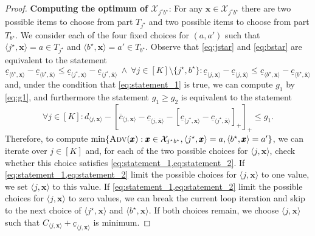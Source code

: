 \documentclass[a4paper,11pt,abstracton]{scrartcl}
\theoremstyle{definition}
\theoremstyle{remark}
\newcommand{\X}{\mathcal{X}}
\begin{document}
\begin{proof}
\textbf{Computing the optimum of $\X_{j^\star b^\star}$}: 
For any $\pmb x \in \X_{j^\star b^\star}$ 
there are two possible items to choose from part $T_{j^\star}$ and two possible items to choose from part $T_{b^\star}$.
We consider each of the four fixed choices for $(a,a')$ such that $\langle j^\star,\pmb{x}\rangle = a \in T_{j^\star}$ and $\langle b^\star,\pmb{x}\rangle = a' \in T_{b^\star}$.
Observe that \cref{eq:jstar} and \cref{eq:bstar} are equivalent to the statement 
\begin{equation} \underline{c}_{\langle b^\star,\pmb{x}\rangle} - \underline{c}_{\langle b^\star,\overline{\pmb{x}}\rangle} \leq \underline{c}_{\langle j^\star,\pmb{x}\rangle} - \underline{c}_{\langle j^\star,\overline{\pmb{x}}\rangle} \ \land \ \forall j \in [K] \setminus \{j^\star, b^\star\} : \underline{c}_{\langle j,\pmb{x}\rangle} - \underline{c}_{\langle j, \overline{\pmb{x}}\rangle} \leq \underline{c}_{\langle b^\star,\pmb{x}\rangle} - \underline{c}_{\langle b^\star,\overline{\pmb{x}}\rangle} 
\label{eq:statement_1}
\end{equation}
and, under the condition that \cref{eq:statement_1} is true, we can compute $g_1$ by \cref{eq:g1}, and furthermore the statement $g_1 \geq g_2$ is equivalent to the statement 
\begin{equation}
\forall j \in [K] : d_{\langle j,\pmb{x}\rangle} - [\overline{c}_{\langle j,\pmb{x}\rangle}-\underline{c}_{\langle j, \overline{\pmb{x}}\rangle} - [\underline{c}_{\langle j^\star,\pmb{x}\rangle} - \underline{c}_{\langle j^\star,\overline{\pmb{x}}\rangle}]_+]_+ \leq g_1.
\label{eq:statement_2} 
\end{equation}
Therefore, to compute $\min\{\textsc{Adv}(\pmb x) : \pmb x  \in \X_{j^\star b^\star}, \langle j^\star,\pmb{x}\rangle = a, \langle b^\star,\pmb{x}\rangle = a'\}$,
we can iterate over $j \in [K]$ and, for each of the two possible choices for 
$\langle j,\pmb{x}\rangle$, check whether this choice satisfies \cref{eq:statement_1,eq:statement_2}.
If \cref{eq:statement_1,eq:statement_2} limit the possible choices for $\langle j,\pmb{x}\rangle$ to one value, we set $\langle j,\pmb{x}\rangle$ to this value. 
If \cref{eq:statement_1,eq:statement_2} limit the possible choices for $\langle j,\pmb{x}\rangle$ to zero values, we can break the current loop iteration and skip to the next choice of $\langle j^\star,\pmb{x}\rangle$ and $\langle b^\star,\pmb{x}\rangle$. 
If both choices remain, we choose $\langle j,\pmb{x}\rangle$ such that $C_{\langle j,\pmb{x}\rangle} + \underline{c}_{\langle j,\pmb{x}\rangle}$ is minimum.


\end{proof}
\end{document}
